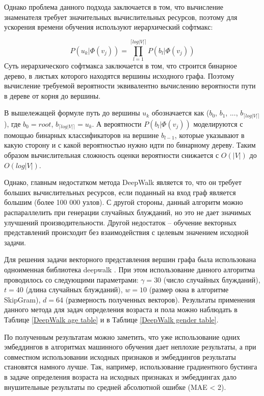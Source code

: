 Однако проблема данного подхода заключается в том, что вычисление знаменателя требует значительных вычислительных ресурсов, поэтому для ускорения времени обучения используют иерархический софтмакс:

$$P(u_k | \Phi(v_j)) = \prod_{l=1}^{\lceil log|V| \rceil} P(b_l | \Phi(v_j))$$
Суть иерархического софтмакса заключается в том, что строится бинарное дерево, в листьях которого находятся вершины исходного графа. Поэтому вычисление требуемой вероятности эквивалентно вычислению вероятности пути в дереве от корня до вершины. 

В вышележащей формуле путь до вершины $u_k$ обозначается как ($b_0$, $b_1$, $...$, $b_{\lceil log|V| \rceil}$), где $b_0 = root$, $b_{\lceil log|V| \rceil} = u_k$. А вероятности $P(b_l | \Phi(v_j))$ моделируются с помощью бинарных классификаторов на вершине $b_{l-1}$, которые указывают в какую сторону и с какой вероятностью нужно идти по бинарному дереву. Таким образом вычислительная сложность оценки вероятности снижается с $O(|V |)$ до $O(log |V |)$.

Однако, главным недостатком метода DeepWalk является то, что он требует больших вычислительных ресурсов, если поданный на вход граф является большим (более 100 000 узлов). С другой стороны, данный алгоритм можно распараллелить при генерации случайных блужданий, но это не дает значимых улучшений производительности. Другой недостаток -- обучение векторных представлений происходит без взаимодействия с целевым значением исходной задачи. 

Для решения задачи векторного представления вершин графа была использована одноименная библиотека deepwalk \cite{deepwalk lib}. При этом использование данного алгоритма проводилось со следующими параметрами:  $\gamma = 30$ (число случайных блужданий), $t = 40$ (длина случайных блужданий), $w = 10$ (размер окна в алгоритме SkipGram), $d = 64$ (размерность полученных векторов). Результаты применения данного метода для задач определения возраста и пола можно наблюдать в Таблице \ref{DeepWalk age table} и в Таблице \ref{DeepWalk gender table}. 

По полученным результатам можно заметить, что уже использование одних эмбеддингов в алгоритмах машинного обучения дает неплохие результаты, а при совместном использовании исходных признаков и эмбеддингов результаты становятся намного лучше. Так, например, использование градиентного бустинга в задаче определения возраста на исходных признаках и эмбеддингах дало внушительные  результаты по средней абсолютной ошибке (MAE < 2).  

